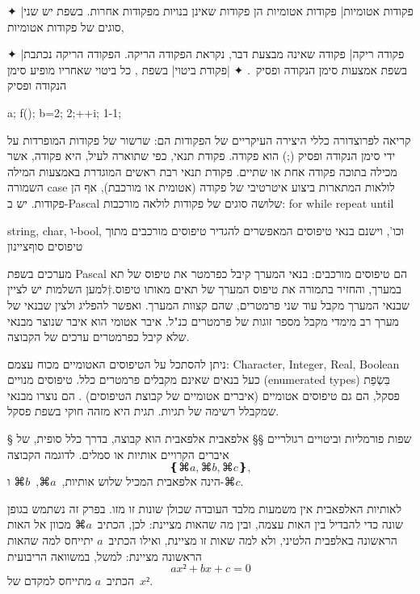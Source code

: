\begin{enumerate}
  ✦ \ע|פקודות אטומיות| פקודות אטומיות הן פקודות שאינן בנויות מפקודות אחרות. בשפת
   יש שני סוגים של פקודות אטומיות,
  \begin{enumerate}
    ✦ \ע|פקודה ריקה| פקודה שאינה מבצעת דבר, נקראת הפקודה הריקה. הפקודה הריקה נכתבת
    בשפת אמצעות סימן הנקודה ופסיק~\cc{;}.
    ✦ \ע|פקודת ביטוי| בשפת , כל ביטוי שאחריו מופיע סימן הנקודה ופסיק~\cc{;|}
    \begin{CPP}
      a; f(); b=2; 2;++i; 1-1;
    \end{CPP}
  \end{enumerate}
  קריאה לפרוצדורה
  כללי היצירה העיקריים של הפקודות הם:
  שרשור של פקודות המופרדות על ידי סימן הנקודה ופסיק (;) הוא פקודה.
  פקודת תנאי, כפי שתוארה לעיל, היא פקודה, אשר מכילה בתוכה פקודה אחת או שתיים.
  פקודת תנאי רבת ראשים המוגדרת באמצעות המילה השמורה case
  לולאות המתארות ביצוע איטרטיבי של פקודה (אטומית או מורכבת), אף הן פקודות. יש
  ב-Pascal שלושה סוגים של פקודות לולאה מורכבות: for
  while
  repeat until
\end{enumerate}

string, char, ו-bool,
וכו', וישנם בנאי טיפוסים המאפשרים להגדיר טיפוסים מורכבים מתוך טיפוסים
סוף{ציינון}

מערכים בשפת Pascal הם טיפוסים מורכבים: בנאי המערך קיבל כפרמטר את טיפוס של תא
במערך, והחזיר בתמורה את טיפוס המערך של תאים מאותו טיפוס.†{למען השלמות יש לציין
שבנאי המערך מקבל עוד שני פרמטרים, שהם קצוות המערך. ואפשר להפליג ולצין שבנאי של
מערך רב מימדי מקבל מספר זוגות של פרמטרים כנ"ל.}
איבר אטומי הוא איבר שנוצר מבנאי שלא קיבל כפרמטרים ערכים של הקבוצה.

ניתן להסתכל על הטיפוסים האטומיים מכוח עצמם: Character, Integer, Real, Boolean
כעל בנאים שאינם מקבלים פרמטרים כלל. טיפוסים מנויים (enumerated types) בִּשְׂפַת
פסקל, הם גם טיפוסים אטומיים (איברים אטומיים של קבוצת הטיפוסים) . הם נוצרו מבנאי
שמקבלל רשימה של תגיות. תגית היא מזהה חוקי בשפת פסקל.

§ שפות פורמליות וביטויים רגולריים
§§ אלפאבית
אלפאבית הוא קבוצה, בדרך כלל סופית, של איברים הקרויים אותיות או סמלים. לדוגמה
הקבוצה
\begin{equation*}
  ❴⌘{a},⌘{b},⌘{c}❵,
\end{equation*}
הינה אלפאבית המכיל שלוש אותיות,~$⌘a$,~$⌘b$ ו-$⌘c$.

לאותיות האלפאבית אין משמעות מלבד העובדה שכולן שונות זו מזו. בפרק זה נשתמש בגופן
שונה כדי להבדיל בין האות עצמה, ובין מה שהאות מציינת: לכן, הכתיב~$⌘a$ מכוון אל
האות הראשונה באלפבית הלטיני, ולא למה שאות זו מציינת, ואילו הכתיב~$a$ יתייחס
למה שהאות הראשונה מציינת:
למשל, במשוואה הריבועית \[
  a x²+bx+c=0
\] הכתיב~$a$ מתייחס למקדם של~$x²$.

